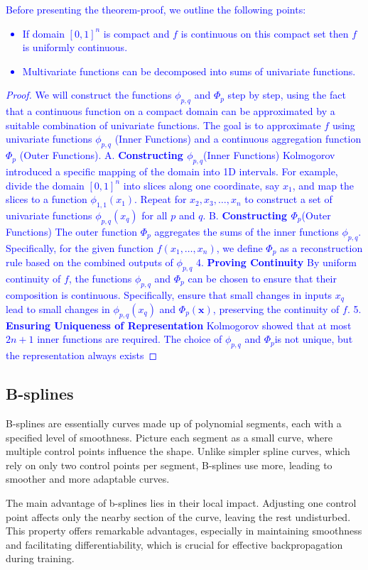 \textcolor{blue}{
Before presenting the theorem-proof, we outline the following points:
\begin{itemize}
    \item If domain $[0,1]^n$ is compact and $f$ is continuous on this compact set then $f$ is uniformly continuous.
    \item Multivariate functions can be decomposed into sums of univariate functions.
\end{itemize}
\begin{proof}
We will construct the functions $\phi_{p,q}$ and $\Phi_p$ step by step, using the fact that a continuous function on a compact domain can be approximated by a suitable combination of univariate functions. The goal is to approximate $f$ using univariate functions $\phi_{p,q}$ (Inner Functions) and a continuous aggregation function $\Phi_p$ (Outer Functions).
A. \textbf{Constructing $\phi_{p,q}$}(Inner Functions)
Kolmogorov introduced a specific mapping of the domain into 1D intervals. For example, divide the domain $[0, 1]^n$ into slices along one coordinate, say $x_1$, and map the slices to a function $\phi_{1,1}(x_1)$. Repeat for $x_2,x_3,\ldots,x_n$ to construct a set of univariate functions $\phi_{p,q}(x_q)$ for all $p$ and $q$.
B. \textbf{Constructing $\Phi_p$}(Outer Functions)
The outer function $\Phi_p$ aggregates the sums of the inner functions $\phi_{p,q}$. Specifically, for the given function $f(x_1, \ldots,x_n)$, we define $\Phi_p$ as a reconstruction rule based on the combined outputs of $\phi_{p,q}$
4. \textbf{Proving Continuity}
By uniform continuity of $f$, the functions $\phi_{p,q}$ and $\Phi_p$
can be chosen to ensure that their composition is continuous. Specifically, ensure that small changes in inputs $x_q$ lead to small changes in $\phi_{p,q}(x_q)$ and $\Phi_{p}(\textbf{x})$, preserving the continuity of $f$.
5. \textbf{Ensuring Uniqueness of Representation}
Kolmogorov showed that at most $2n+1$ inner functions are required. The choice of $\phi_{p,q}$ and $\Phi_{p}$is not unique, but the representation always exists
\end{proof}
}


\subsection{B-splines}
B-splines are essentially curves made up of polynomial segments, each with a specified level of smoothness. Picture each segment as a small curve, where multiple control points influence the shape. Unlike simpler spline curves, which rely on only two control points per segment, B-splines use more, leading to smoother and more adaptable curves.

The main advantage of b-splines lies in their local impact. Adjusting one control point affects only the nearby section of the curve, leaving the rest undisturbed. This property offers remarkable advantages, especially in maintaining smoothness and facilitating differentiability, which is crucial for effective backpropagation during training.